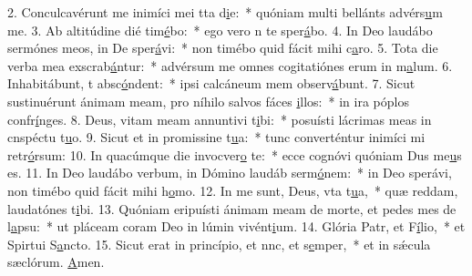 2. Conculcavérunt me inimíci mei tta d\uline{i}e:~* quóniam multi bellánts advérs\uline{u}m me.
3. Ab altitúdine dié tim\uline{é}bo:~* ego vero n te sper\uline{á}bo.
4. In Deo laudábo sermónes meos, in De sper\uline{á}vi:~* non timébo quid fácit mihi c\uline{a}ro.
5. Tota die verba mea exscrab\uline{á}ntur:~* advérsum me omnes cogitatiónes erum in m\uline{a}lum.
6. Inhabitábunt, t absc\uline{ó}ndent:~* ipsi calcáneum mem observ\uline{á}bunt.
7. Sicut sustinuérunt ánimam meam, pro níhilo salvos fáces \uline{i}llos:~* in ira póplos confr\uline{í}nges.
8. Deus, vitam meam annuntivi t\uline{i}bi:~* posuísti lácrimas meas in cnspéctu t\uline{u}o.
9. Sicut et in promissine t\uline{u}a:~* tunc converténtur inimíci mi retr\uline{ó}rsum:
10. In quacúmque die invocver\uline{o} te:~* ecce cognóvi quóniam Dus me\uline{u}s es.
11. In Deo laudábo verbum, in Dómino laudáb serm\uline{ó}nem:~* in Deo sperávi, non timébo quid fácit mihi h\uline{o}mo.
12. In me sunt, Deus, vta t\uline{u}a,~* quæ reddam, laudatónes t\uline{i}bi.
13. Quóniam eripuísti ánimam meam de morte, et pedes mes de l\uline{a}psu:~* ut pláceam coram Deo in lúmin vivént\uline{i}um.
14. Glória Patr, et F\uline{í}lio,~* et Spirtui S\uline{a}ncto.
15. Sicut erat in princípio, et nnc, et s\uline{e}mper,~* et in sǽcula sæclórum. \uline{A}men.
